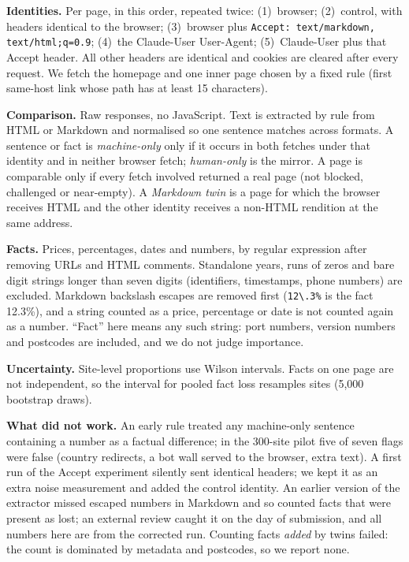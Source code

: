 \documentclass[10pt,a4paper]{article}
\newcommand{\hdr}[1]{\texttt{#1}}
\begin{document}
\textbf{Identities.} Per page, in this order, repeated twice: (1)~browser; (2)~control, with headers identical to the browser; (3)~browser plus \hdr{Accept: text/markdown, text/html;q=0.9}; (4)~the Claude-User User-Agent; (5)~Claude-User plus that Accept header. All other headers are identical and cookies are cleared after every request. We fetch the homepage and one inner page chosen by a fixed rule (first same-host link whose path has at least 15 characters).

\textbf{Comparison.} Raw responses, no JavaScript. Text is extracted by rule from HTML or Markdown and normalised so one sentence matches across formats. A sentence or fact is \emph{machine-only} only if it occurs in both fetches under that identity and in neither browser fetch; \emph{human-only} is the mirror. A page is comparable only if every fetch involved returned a real page (not blocked, challenged or near-empty). A \emph{Markdown twin} is a page for which the browser receives HTML and the other identity receives a non-HTML rendition at the same address.

\textbf{Facts.} Prices, percentages, dates and numbers, by regular expression after removing URLs and HTML comments. Standalone years, runs of zeros and bare digit strings longer than seven digits (identifiers, timestamps, phone numbers) are excluded. Markdown backslash escapes are removed first (\texttt{12\textbackslash.3\%} is the fact 12.3\%), and a string counted as a price, percentage or date is not counted again as a number. ``Fact'' here means any such string: port numbers, version numbers and postcodes are included, and we do not judge importance.

\textbf{Uncertainty.} Site-level proportions use Wilson intervals. Facts on one page are not independent, so the interval for pooled fact loss resamples sites (5{,}000 bootstrap draws).

\textbf{What did not work.} An early rule treated any machine-only sentence containing a number as a factual difference; in the 300-site pilot five of seven flags were false (country redirects, a bot wall served to the browser, extra text). A first run of the Accept experiment silently sent identical headers; we kept it as an extra noise measurement and added the control identity. An earlier version of the extractor missed escaped numbers in Markdown and so counted facts that were present as lost; an external review caught it on the day of submission, and all numbers here are from the corrected run. Counting facts \emph{added} by twins failed: the count is dominated by metadata and postcodes, so we report none.
\end{document}
